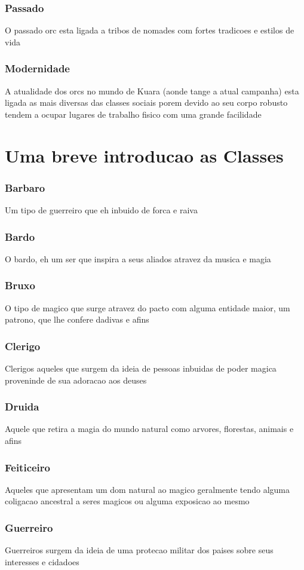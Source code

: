\documentclass{book}
\begin{document}
\section{Passado}
O passado orc esta ligada a tribos de nomades com fortes tradicoes e estilos de vida
\section{Modernidade}
A atualidade dos orcs no mundo de Kuara (aonde tange a atual campanha) esta ligada as mais 
diversas das classes sociais porem devido ao seu corpo robusto tendem a ocupar lugares de 
trabalho fisico com uma grande facilidade

\part{Uma breve introducao as Classes}
\section{Barbaro}
Um tipo de guerreiro que eh inbuido de forca e raiva 
\section{Bardo}
O bardo, eh um ser que inspira a seus aliados atravez da musica e magia
\section{Bruxo}
O tipo de magico que surge atravez do pacto com alguma entidade maior, um patrono, que lhe 
confere dadivas e afins
\section{Clerigo}
Clerigos aqueles que surgem da ideia de pessoas inbuidas de poder magica proveninde de 
sua adoracao aos deuses
\section{Druida}
Aquele que retira a magia do mundo natural como arvores, florestas, animais e afins
\section{Feiticeiro}
Aqueles que apresentam um dom natural ao magico geralmente tendo alguma coligacao ancestral 
a seres magicos ou alguma exposicao ao mesmo
\section{Guerreiro}
Guerreiros surgem da ideia de uma protecao militar dos paises sobre seus interesses e cidadoes
\end{document}
